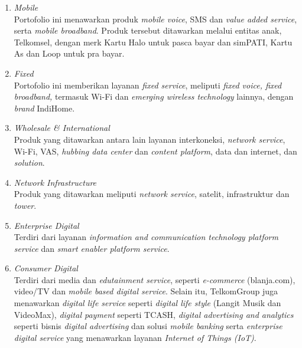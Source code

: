 \begin{enumerate}
	\item \textit{Mobile}\\
	\tab Portofolio ini menawarkan produk \textit{mobile voice}, SMS dan \textit{value added service}, serta \textit{mobile broadband}. Produk tersebut ditawarkan melalui entitas anak, Telkomsel, dengan merk  Kartu Halo untuk pasca bayar dan simPATI, Kartu As dan Loop untuk pra bayar.\\
	\item \textit{Fixed}\\
	\tab Portofolio ini memberikan layanan \textit{fixed service}, meliputi \textit{fixed voice, fixed broadband, }termasuk Wi-Fi dan \textit{emerging wireless technology} lainnya, dengan \textit{brand} IndiHome.\\
	\item \textit{Wholesale \& International}\\
	\tab Produk yang ditawarkan antara lain layanan interkoneksi, \textit{network service}, Wi-Fi, VAS, \textit{hubbing data center} dan \textit{content platform}, data dan internet, dan \textit{solution}.\\
	\item \textit{Network Infrastructure}\\
	\tab Produk yang ditawarkan meliputi \textit{network service}, satelit, infrastruktur dan \textit{tower}.\\
	\item \textit{Enterprise Digital}\\
	\tab Terdiri dari layanan \textit{information and communication technology platform service} dan \textit{smart enabler platform service}.\\
	\item \textit{Consumer Digital}\\
	\tab Terdiri dari media dan \textit{edutainment service}, seperti \textit{e-commerce} (blanja.com), video/TV dan \textit{mobile based digital service}. Selain itu, TelkomGroup juga menawarkan \textit{digital life service} seperti \textit{digital life style} (Langit Musik dan VideoMax), \textit{digital payment} seperti TCASH, \textit{digital advertising and analytics} seperti bisnis \textit{digital advertising} dan solusi \textit{mobile banking} serta \textit{enterprise digital service} yang menawarkan layanan \textit{Internet of Things (IoT)}.
\end{enumerate}

